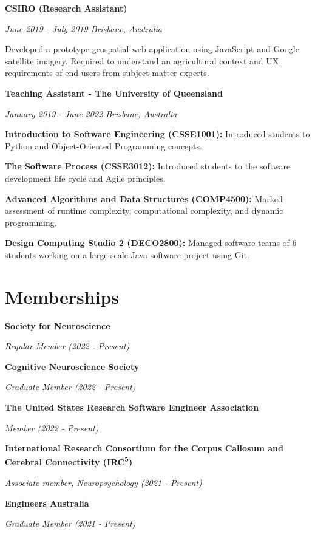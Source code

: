 \documentclass{article}
\begin{document}
  {\large\textbf{CSIRO (Research Assistant)}}

  \textit{June 2019 - July 2019 \hfill Brisbane, Australia}

  Developed a prototype geospatial web application using JavaScript and Google satellite imagery. Required to understand an agricultural context and UX requirements of end-users from subject-matter experts.

  \medbreak

  {\large\textbf{Teaching Assistant - The University of Queensland}}

  \textit{January 2019 - June 2022 \hfill Brisbane, Australia}

  \textbf{Introduction to Software Engineering (CSSE1001):} Introduced students to Python and Object-Oriented Programming concepts.

  \textbf{The Software Process (CSSE3012):} Introduced students to the software development life cycle and Agile principles.

  \textbf{Advanced Algorithms and Data Structures (COMP4500):} Marked assessment of runtime complexity, computational complexity, and dynamic programming.

  \textbf{Design Computing Studio 2 (DECO2800):} Managed software teams of 6 students working on a large-scale Java software project using Git.

  \section*{Memberships}
  \large\textbf{Society for Neuroscience}

  \textit{Regular Member (2022 - Present)}

  \large\textbf{Cognitive Neuroscience Society}

  \textit{Graduate Member (2022 - Present)}

  \large\textbf{The United States Research Software Engineer Association}

  \textit{Member (2022 - Present)}  

  \large\textbf{International Research Consortium for the Corpus Callosum and Cerebral Connectivity (IRC\textsuperscript{5})}

  \textit{Associate member, Neuropsychology (2021 - Present)}

  \large\textbf{Engineers Australia}

  \textit{Graduate Member (2021 - Present)}

\end{document}
